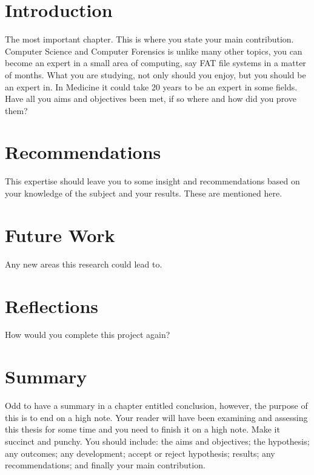 \section{Introduction}
The most important chapter. 
This is where you state your main contribution. 
Computer Science and Computer Forensics is unlike many other topics, you can become an expert in a small area of computing, say FAT file systems in a matter of months. 
What you are studying, not only should you enjoy, but you should be an expert in. 
In Medicine it could take 20 years to be an expert in some fields. 
Have all you aims and objectives been met, if so where and how did you prove them?

\section{Recommendations}
This expertise should leave you to some insight and recommendations based on your knowledge of the subject and your results. These are mentioned here. 

\section{Future Work}
Any new areas this research could lead to.

\section{Reflections}
How would you complete this project again?

\section{Summary}
Odd to have a summary in a chapter entitled conclusion, however, the purpose of this is to end on a high note. Your reader will have been examining and assessing this thesis for some time and you need to finish it on a high note. Make it succinct and punchy. You should include: the aims and objectives; the hypothesis; any outcomes; any development; accept or reject hypothesis; results; any recommendations; and finally your main contribution.



